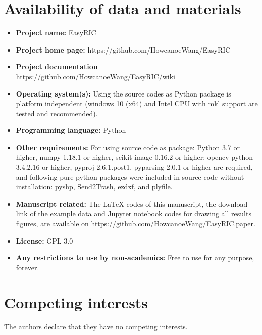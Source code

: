 \documentclass[doublespacing]{configs/bmcart}
\begin{document}
\begin{backmatter}
\section*{Availability of data and materials}
\begin{itemize}
  \item \textbf{Project name:} EasyRIC
  \item \textbf{Project home page:} https://github.com/HowcanoeWang/EasyRIC
  \item \textbf{Project documentation} https://github.com/HowcanoeWang/EasyRIC/wiki
  \item \textbf{Operating system(s):} Using the source codes as Python package is platform independent (windows 10 (x64) and Intel CPU with \acrfull*{mkl} support are tested and recommended).
  \item \textbf{Programming language: } Python
  \item \textbf{Other requirements:} For using source code as package: Python 3.7 or higher, numpy 1.18.1 or higher, scikit-image 0.16.2 or higher; opencv-python 3.4.2.16 or higher, pyproj 2.6.1.post1, pyparsing 2.0.1 or higher are required, and following pure python packages were included in source code without installation: pyshp, Send2Trash, ezdxf, and plyfile.
  \item \textbf{Manuscript related:} The LaTeX codes of this manuscript, the download link of the example data and Jupyter notebook codes for drawing all results figures, are available on \url{https://github.com/HowcanoeWang/EasyRIC.paper}.
  \item \textbf{License:} GPL-3.0
  \item \textbf{Any restrictions to use by non-academics:} Free to use for any purpose, forever.
\end{itemize}

\section*{Competing interests}
The authors declare that they have no competing interests.



\end{backmatter}
\end{document}
